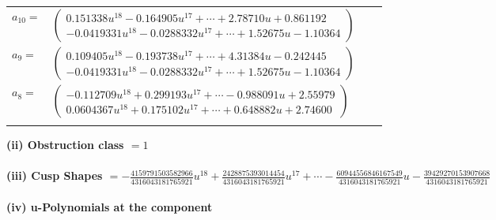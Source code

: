 \documentclass[1p]{elsarticle_modified}
\theoremstyle{definition}
\begin{document}
\begin{tabular}{m{7pt} m{180pt} m{7pt} m{180pt} }
\flushright $a_{10}=$&$\begin{pmatrix}0.151338 u^{18}-0.164905 u^{17}+\cdots+2.78710 u+0.861192\\-0.0419331 u^{18}-0.0288332 u^{17}+\cdots+1.52675 u-1.10364\end{pmatrix}$ \\
\flushright $a_{9}=$&$\begin{pmatrix}0.109405 u^{18}-0.193738 u^{17}+\cdots+4.31384 u-0.242445\\-0.0419331 u^{18}-0.0288332 u^{17}+\cdots+1.52675 u-1.10364\end{pmatrix}$ \\
\flushright $a_{8}=$&$\begin{pmatrix}-0.112709 u^{18}+0.299193 u^{17}+\cdots-0.988091 u+2.55979\\0.0604367 u^{18}+0.175102 u^{17}+\cdots+0.648882 u+2.74600\end{pmatrix}$\\&\end{tabular}
\flushleft \textbf{(ii) Obstruction class $= 1$}\\~\\
\flushleft \textbf{(iii) Cusp Shapes $= -\frac{4159791503582966}{4316043181765921} u^{18}+\frac{2428875393014454}{4316043181765921} u^{17}+\cdots-\frac{60944556846167549}{4316043181765921} u-\frac{39429270153907668}{4316043181765921}$}\\~\\
\newpage\renewcommand{\arraystretch}{1}
\flushleft \textbf{(iv) u-Polynomials at the component}\newline \\
\end{document}
